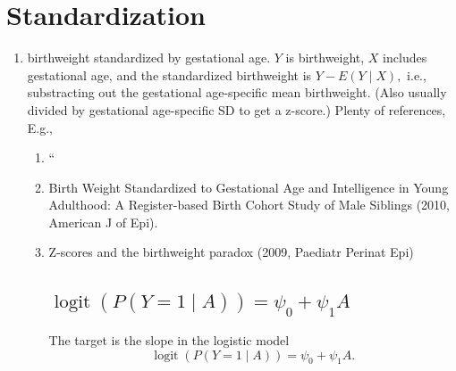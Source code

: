 \message{ !name(manuscript.tex)}\documentclass[10pt,a4paper]{amsart}
\DeclareMathOperator{\logit}{logit}
\begin{document}
\section{Standardization}
\begin{enumerate}
  \item birthweight standardized by gestational age. $Y$ is
    birthweight, $X$ includes gestational age, and the standardized
    birthweight is $Y-E(Y\mid X),$ i.e., substracting out the
    gestational age-specific mean birthweight. (Also usually divided
    by gestational age-specific SD to get a z-score.) Plenty of
    references, E.g.,
    \begin{enumerate}
      \item ``
      \item Birth Weight Standardized to Gestational Age and Intelligence in Young
    Adulthood: A Register-based Birth Cohort Study of Male Siblings
    (2010, American J of Epi).
  \item Z-scores and the birthweight paradox (2009, Paediatr Perinat
    Epi)
    

\subsection{$\logit(P(Y=1\mid A)) = \psi_0 + \psi_1A$} The target is the
slope in the logistic model
\[
  \logit(P(Y=1\mid A)) = \psi_0 + \psi_1A.
\]


\end{enumerate}
\end{enumerate}
\end{document}
